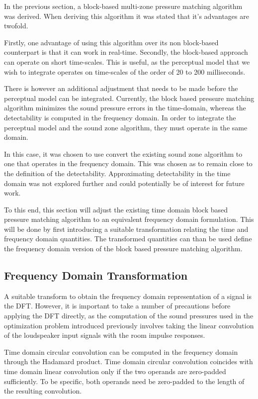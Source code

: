 In the previous section, a block-based multi-zone pressure matching algorithm was derived.
When deriving this algorithm it was stated that it's advantages are twofold.

Firstly, one advantage of using this algorithm over its non block-based counterpart is that it can work in real-time.
Secondly, the block-based approach can operate on short time-scales.
This is useful, as the perceptual model that we wish to integrate operates on time-scales of the order of 20 to 200 milliseconds.

There is however an additional adjustment that needs to be made before the perceptual model can be integrated. 
Currently, the block based pressure matching algorithm minimizes the sound pressure errors in the time-domain, whereas the detectability is computed in the 
frequency domain.
In order to integrate the perceptual model and the sound zone algorithm, they must operate in the same domain.

In this case, it was chosen to use convert the existing sound zone algorithm to one that operates in the frequency domain.
This was chosen as to remain close to the definition of the detectability.
Approximating detectability in the time domain was not explored further and could potentially be of interest for future work.

To this end, this section will adjust the existing time domain block based pressure matching algorithm to an equivalent frequency domain formulation.
This will be done by first introducing a suitable transformation relating the time and frequency domain quantities.
The transformed quantities can than be used define the frequency domain version of the block based pressure matching algorithm.

\subsection{Frequency Domain Transformation}
A suitable transform to obtain the frequency domain representation of a signal is the DFT.
However, it is important to take a number of precautions before applying the DFT directly,
as the computation of the sound pressures used in the optimization problem introduced previously involves taking the 
linear convolution of the loudspeaker input signals with the room impulse responses.

Time domain circular convolution can be computed in the frequency domain through the Hadamard product.
Time domain circular convolution coincides with time domain linear convolution only if the two operands are zero-padded sufficiently.
To be specific, both operands need be zero-padded to the length of the resulting convolution.

